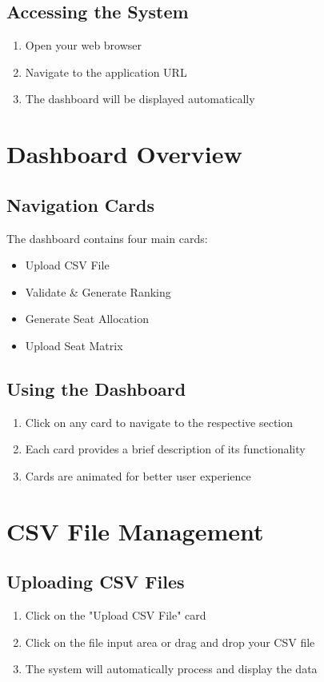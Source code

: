 \documentclass[12pt,a4paper]{article}
\begin{document}
\subsection{Accessing the System}
\begin{enumerate}
    \item Open your web browser
    \item Navigate to the application URL
    \item The dashboard will be displayed automatically
\end{enumerate}

\section{Dashboard Overview}
\subsection{Navigation Cards}
The dashboard contains four main cards:
\begin{itemize}
    \item Upload CSV File
    \item Validate \& Generate Ranking
    \item Generate Seat Allocation
    \item Upload Seat Matrix
\end{itemize}

\subsection{Using the Dashboard}
\begin{enumerate}
    \item Click on any card to navigate to the respective section
    \item Each card provides a brief description of its functionality
    \item Cards are animated for better user experience
\end{enumerate}

\section{CSV File Management}
\subsection{Uploading CSV Files}
\begin{enumerate}
    \item Click on the "Upload CSV File" card
    \item Click on the file input area or drag and drop your CSV file
    \item The system will automatically process and display the data
\end{enumerate}
\end{document}
